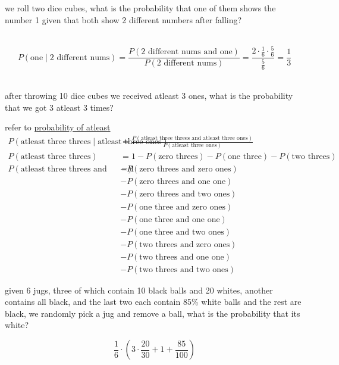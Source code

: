\documentclass[a4paper,12pt]{article}
\begin{document}
\begin{question}
we roll two dice cubes, what is the probability that one of them shows the number 1 given that both show 2 different numbers after falling?\\
\begin{answer}
\\

\[
P(\text{one} \mid \text{2 different nums}) = \frac{P(\text{2 different nums and one})}{P(\text{2 different nums})} = \frac{2 \cdot \frac{1}{6} \cdot \frac{5}{6}}{\frac{5}{6}} = \frac{1}{3}
\]\\
\end{answer}
\end{question}

\begin{question}
after throwing 10 dice cubes we received atleast 3 ones, what is the probability that we got 3 atleast 3 times?\\
\begin{answer}
refer to \href{probability.org}{probability of atleast}\\
\begin{align*}
  P(\text{atleast three threes} \mid \text{atleast three ones}) &= \frac{P(\text{atleast three threes and atleast three ones})}{P(\text{atleast three ones})}\\
  P(\text{atleast three threes}) &= 1-P(\text{zero threes})-P(\text{one three})-P(\text{two threes})\\
  P(\text{atleast three threes and atleast three ones}) = 1 &- P(\text{zero threes and zero ones})\\
  &- P(\text{zero threes and one one})\\
  &- P(\text{zero threes and two ones})\\
  &- P(\text{one three and zero ones})\\
  &- P(\text{one three and one one})\\
  &- P(\text{one three and two ones})\\
  &- P(\text{two threes and zero ones})\\
  &- P(\text{two threes and one one})\\
  &- P(\text{two threes and two ones})
\end{align*}
\end{answer}
\end{question}

\begin{question}
given 6 jugs, three of which contain 10 black balls and 20 whites, another contains all black, and the last two each contain 85\% white balls and the rest are black, we randomly pick a jug and remove a ball, what is the probability that its white?\\
\begin{answer}
\[
\frac{1}{6} \cdot \left(3 \cdot \frac{20}{30} + 1 + \frac{85}{100}\right)
\]\\
\end{answer}
\end{question}
\end{document}
